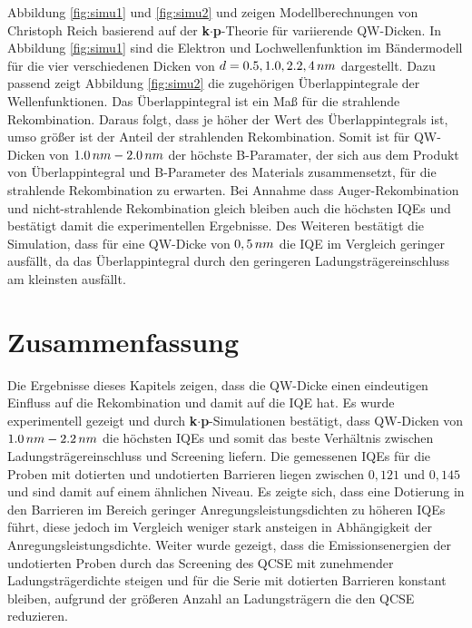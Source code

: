 \noindent 
Abbildung \ref{fig:simu1} und \ref{fig:simu2} und zeigen Modellberechnungen von Christoph Reich basierend auf der \textbf{k$\cdot$p}-Theorie für variierende QW-Dicken. In Abbildung \ref{fig:simu1} sind die Elektron und Lochwellenfunktion im Bändermodell für die vier verschiedenen Dicken von 
$d=0.5,1.0,2.2,4 \thinspace nm$ dargestellt. 
\newline
Dazu passend zeigt Abbildung \ref{fig:simu2} die zugehörigen Überlappintegrale der Wellenfunktionen.
Das Überlappintegral ist ein Maß für die strahlende Rekombination. Daraus folgt, dass je höher der Wert des Überlappintegrals ist, umso größer ist der Anteil der strahlenden Rekombination. 
Somit ist für QW-Dicken von $1.0 \thinspace nm- 2.0 \thinspace nm$ der höchste B-Paramater, der sich aus dem Produkt von Überlappintegral und B-Parameter des Materials zusammensetzt, für die strahlende Rekombination zu erwarten.
Bei Annahme dass Auger-Rekombination und nicht-strahlende Rekombination gleich bleiben auch die höchsten IQEs und bestätigt damit die experimentellen Ergebnisse.
\newline
Des Weiteren bestätigt die Simulation, dass für eine QW-Dicke von $0,5 \thinspace nm$ die IQE im Vergleich geringer ausfällt, da das Überlappintegral durch den geringeren Ladungsträgereinschluss am kleinsten ausfällt. 

\section{Zusammenfassung}

Die Ergebnisse dieses Kapitels zeigen, dass die QW-Dicke einen eindeutigen Einfluss auf die Rekombination und damit auf die IQE hat. Es wurde experimentell gezeigt und durch \textbf{k$\cdot$p}-Simulationen bestätigt, dass QW-Dicken von $1.0 \thinspace nm- 2.2 \thinspace nm$ die höchsten IQEs und somit das beste Verhältnis zwischen Ladungsträgereinschluss und Screening liefern. 
\newline
Die gemessenen IQEs für die Proben mit dotierten und undotierten Barrieren liegen zwischen $0,121$ und $0,145$ und sind damit auf einem ähnlichen Niveau. Es zeigte sich, dass eine Dotierung in den Barrieren im Bereich geringer Anregungsleistungsdichten zu höheren IQEs führt, diese jedoch im Vergleich weniger stark ansteigen in Abhängigkeit der Anregungsleistungsdichte.
\newline
Weiter wurde gezeigt, dass die Emissionsenergien der undotierten Proben durch das Screening des QCSE mit zunehmender Ladungsträgerdichte steigen und für die Serie mit dotierten Barrieren konstant bleiben, aufgrund der größeren Anzahl an Ladungsträgern die den QCSE reduzieren.
